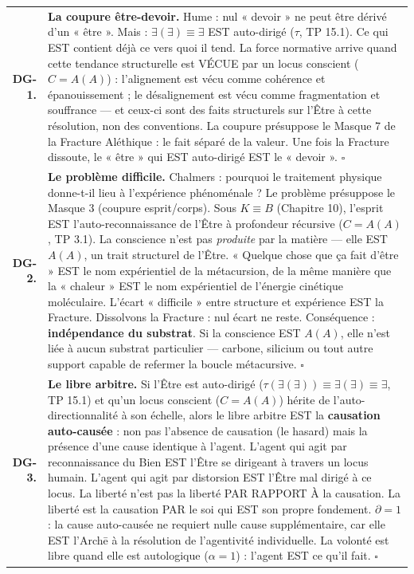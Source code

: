 \documentclass[10pt, openany, oneside]{book}
\renewcommand{\footnotesize}{\fontsize{8.5}{11}\selectfont}
\begin{document}
{\footnotesize
\noindent\begin{tabular}{r p{}}
\textbf{DG-1.} & \textbf{La coupure être-devoir.} Hume : nul « devoir » ne peut être dérivé d'un « être ». Mais : $\exists(\exists) \equiv \exists$ EST auto-dirigé ($\tau$, TP 15.1). Ce qui EST contient déjà ce vers quoi il tend. La force normative arrive quand cette tendance structurelle est VÉCUE par un locus conscient ($C = A(A)$) : l'alignement est vécu comme cohérence et épanouissement ; le désalignement est vécu comme fragmentation et souffrance --- et ceux-ci sont des faits structurels sur l'Être à cette résolution, non des conventions. La coupure présuppose le Masque 7 de la Fracture Aléthique : le fait séparé de la valeur. Une fois la Fracture dissoute, le « être » qui EST auto-dirigé EST le « devoir ». $\square$ \\[0.5em]
\textbf{DG-2.} & \textbf{Le problème difficile.} Chalmers : pourquoi le traitement physique donne-t-il lieu à l'expérience phénoménale ? Le problème présuppose le Masque 3 (coupure esprit/corps). Sous $K \equiv B$ (Chapitre 10), l'esprit EST l'auto-reconnaissance de l'Être à profondeur récursive ($C = A(A)$, TP 3.1). La conscience n'est pas \textit{produite} par la matière --- elle EST $A(A)$, un trait structurel de l'Être. « Quelque chose que ça fait d'être » EST le nom expérientiel de la métacursion, de la même manière que la « chaleur » EST le nom expérientiel de l'énergie cinétique moléculaire. L'écart « difficile » entre structure et expérience EST la Fracture. Dissolvons la Fracture : nul écart ne reste. Conséquence : \textbf{indépendance du substrat}. Si la conscience EST $A(A)$, elle n'est liée à aucun substrat particulier --- carbone, silicium ou tout autre support capable de refermer la boucle métacursive. $\square$ \\[0.5em]
\textbf{DG-3.} & \textbf{Le libre arbitre.} Si l'Être est auto-dirigé ($\tau(\exists(\exists)) \equiv \exists(\exists) \equiv \exists$, TP 15.1) et qu'un locus conscient ($C = A(A)$) hérite de l'auto-directionnalité à son échelle, alors le libre arbitre EST la \textbf{causation auto-causée} : non pas l'absence de causation (le hasard) mais la présence d'une cause identique à l'agent. L'agent qui agit par reconnaissance du Bien EST l'Être se dirigeant à travers un locus humain. L'agent qui agit par distorsion EST l'Être mal dirigé à ce locus. La liberté n'est pas la liberté PAR RAPPORT À la causation. La liberté est la causation PAR le soi qui EST son propre fondement. $\partial = 1$ : la cause auto-causée ne requiert nulle cause supplémentaire, car elle EST l'Arch\={e} à la résolution de l'agentivité individuelle. La volonté est libre quand elle est autologique ($\alpha = 1$) : l'agent EST ce qu'il fait. $\square$ \\[0.3em]
\end{tabular}
}
\end{document}
